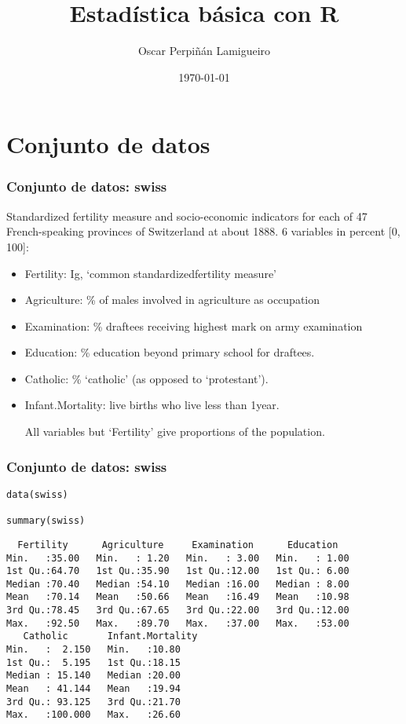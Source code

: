 \documentclass{beamer}
\title{Estadística básica con R}
\author{Oscar Perpiñán Lamigueiro}
\date{\today}
\begin{document}
\maketitle




\section{Conjunto de datos}
\label{sec-1}
\begin{frame}
\frametitle{Conjunto de datos: swiss}
\label{sec-1-1}

Standardized fertility measure and socio-economic indicators for each
of 47 French-speaking provinces of Switzerland at about 1888. 6 variables in percent [0, 100]:

\begin{itemize}
\item Fertility:         Ig, ‘common standardizedfertility measure’
\item Agriculture:       \% of males involved in agriculture 
                               as occupation
\item Examination:       \% draftees receiving highest mark 
   on army examination
\item Education:         \% education beyond primary school for draftees.
\item Catholic:          \% ‘catholic’ (as opposed to ‘protestant’).
\item Infant.Mortality:  live births who live less than 1year.           
      
     All variables but ‘Fertility’ give proportions of the population.
\end{itemize}
\end{frame}
\begin{frame}[fragile]
\frametitle{Conjunto de datos: swiss}
\label{sec-1-2}



\lstset{language=R}
\begin{lstlisting}
data(swiss)

summary(swiss)
\end{lstlisting}


\begin{verbatim}
  Fertility      Agriculture     Examination      Education    
Min.   :35.00   Min.   : 1.20   Min.   : 3.00   Min.   : 1.00  
1st Qu.:64.70   1st Qu.:35.90   1st Qu.:12.00   1st Qu.: 6.00  
Median :70.40   Median :54.10   Median :16.00   Median : 8.00  
Mean   :70.14   Mean   :50.66   Mean   :16.49   Mean   :10.98  
3rd Qu.:78.45   3rd Qu.:67.65   3rd Qu.:22.00   3rd Qu.:12.00  
Max.   :92.50   Max.   :89.70   Max.   :37.00   Max.   :53.00  
   Catholic       Infant.Mortality
Min.   :  2.150   Min.   :10.80   
1st Qu.:  5.195   1st Qu.:18.15   
Median : 15.140   Median :20.00   
Mean   : 41.144   Mean   :19.94   
3rd Qu.: 93.125   3rd Qu.:21.70   
Max.   :100.000   Max.   :26.60
\end{verbatim}
\end{frame}
\end{document}
